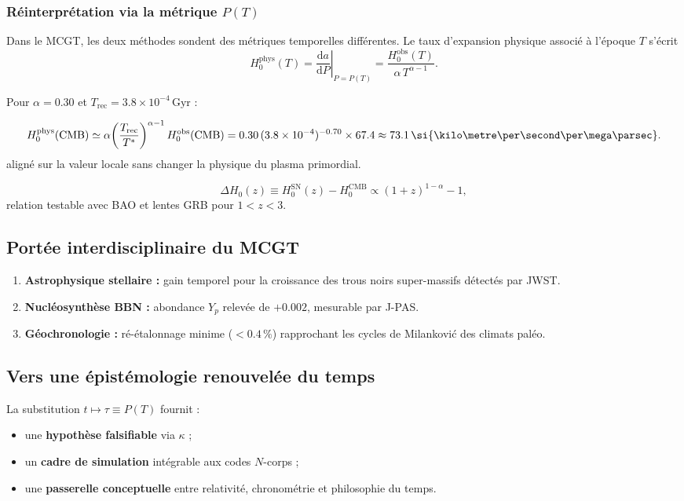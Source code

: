 \documentclass[11pt]{article}
\begin{document}
\subsubsection*{Réinterprétation via la métrique \(P(T)\)}

Dans le MCGT, les deux méthodes sondent des métriques temporelles
différentes.  Le taux d’expansion physique associé à l’époque \(T\) s’écrit
\[
H_{0}^{\mathrm{phys}}(T)=
\left.\frac{\mathrm d a}{\mathrm dP}\right|_{P=P(T)}
=\frac{H_{0}^{\mathrm{obs}}(T)}{\alpha\,T^{\alpha-1}} .
\]

Pour \(\alpha = 0.30\) et \(T_{\mathrm{rec}} = 3.8\times10^{-4}\,\mathrm{Gyr}\) :

\[
H_{0}^{\mathrm{phys}}(\mathrm{CMB})
\simeq
\alpha\!\left(\frac{T_{\mathrm{rec}}}{T^{\ast}}\right)^{\alpha-1}
H_{0}^{\mathrm{obs}}(\mathrm{CMB})
=
0.30\,(3.8\times10^{-4})^{-0.70}\times 67.4
\approx
73.1\,
\si{\kilo\metre\per\second\per\mega\parsec}.
\]
aligné sur la valeur locale sans changer la physique du plasma primordial.

\[
\Delta H_0(z)\equiv
H_0^{\mathrm{SN}}(z)-H_0^{\mathrm{CMB}}
\propto(1+z)^{1-\alpha}-1,
\]
relation testable avec BAO et lentes GRB pour \(1<z<3\).

\subsection{Portée interdisciplinaire du MCGT}

\begin{enumerate}
  \item \textbf{Astrophysique stellaire :} gain temporel pour
        la croissance des trous noirs super-massifs détectés par JWST.
  \item \textbf{Nucléosynthèse BBN :} abondance
        \(Y_p\) relevée de \(+0.002\), mesurable par J-PAS.
  \item \textbf{Géochronologie :} ré-étalonnage minime
        (\(<0.4\,\%\)) rapprochant les cycles de Milanković
        des climats paléo.
\end{enumerate}

\subsection{Vers une épistémologie renouvelée du temps}

La substitution \(t\mapsto\tau\equiv P(T)\) fournit :

\begin{itemize}
  \item une \textbf{hypothèse falsifiable} via \(\kappa\) ;
  \item un \textbf{cadre de simulation} intégrable aux codes \(N\)-corps ;
  \item une \textbf{passerelle conceptuelle} entre relativité,
        chronométrie et philosophie du temps.
\end{itemize}
\end{document}
